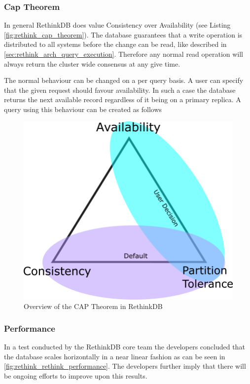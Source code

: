 \subsubsection{Cap Theorem}
In general RethinkDB does value Consistency over Availability (see Listing \autoref{fig:rethink_cap_theorem}). The database guarantees that a write operation is distributed to all systems before the change can be read, like described in \autoref{sec:rethink_arch_query_execution}. Therefore any normal read operation will always return the cluster wide consensus at any give time.


The normal behaviour can be changed on a per query basis. A user can specify that the given request should favour availability. In such a case the database returns the next available record regardless of it being on a primary replica. A query using this behaviour can be created as follows


\begin{figure}[ht]
    \centering
    \includegraphics{img/rethinkCapTheorem.png}
    \caption{Overview of the CAP Theorem in RethinkDB}
    \label{fig:rethink_cap_theorem}
\end{figure}

\subsubsection{Performance}

In a test conducted by the RethinkDB core team the developers concluded that the database scales horizontally in a near linear fashion \autocite{rethinkdb:performance} as can be seen in \autoref{fig:rethink_rethink_performance}. The developers further imply that there will be ongoing efforts to improve upon this results.

